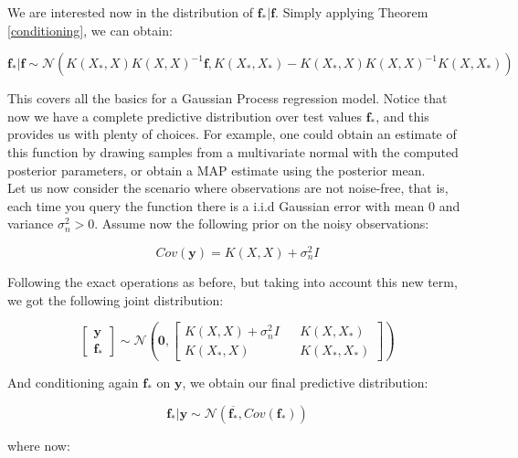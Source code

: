 \documentclass[10pt,a4paper,twoside]{book}
\begin{document}
We are interested now in the distribution of $\boldsymbol{f_{*}}|\boldsymbol{f}$. Simply applying Theorem \ref{conditioning}, we can obtain:

\begin{equation}
\boldsymbol{f_*|f} \sim \mathcal{N}\left(K(X_*, X)K(X, X)^{-1}\boldsymbol{f}, K(X_*, X_*) - K(X_*, X)K(X, X)^{-1}K(X, X_*) \right)
\end{equation}

This covers all the basics for a Gaussian Process regression model. Notice that now we have a complete predictive distribution over test values $\boldsymbol{f_{*}}$, and this provides us with plenty of choices. For example, one could obtain an estimate of this function by drawing samples from a multivariate normal with the computed posterior parameters, or obtain a MAP estimate using the posterior mean.\\

Let us now consider the scenario where observations are not noise-free, that is, each time you query the function there is a i.i.d Gaussian error with mean $0$ and variance $\sigma_n^2 > 0$. Assume now the following prior on the noisy observations:

\begin{equation}
Cov(\boldsymbol{y}) = K(X, X) + \sigma^2_n I 
\end{equation}

Following the exact operations as before, but taking into account this new term, we got the following joint distribution:

\begin{equation}
\begin{bmatrix}
\boldsymbol{y}\\
\boldsymbol{f_*}
\end{bmatrix} \sim \mathcal{N}\left(
\boldsymbol{0},
\begin{bmatrix}
K(X, X) + \sigma^2_n I && K(X, X_*) \\
K(X_*, X) && K(X_*, X_*)
\end{bmatrix}
\right)
\end{equation}

And conditioning again $\boldsymbol{f_{*}}$ on $\boldsymbol{y}$, we obtain our final predictive distribution:

\begin{equation}
\boldsymbol{f_*|y} \sim \mathcal{N}(\boldsymbol{\overline{f_*}},  Cov(\boldsymbol{f_*}))
\end{equation}

where now:
\end{document}
